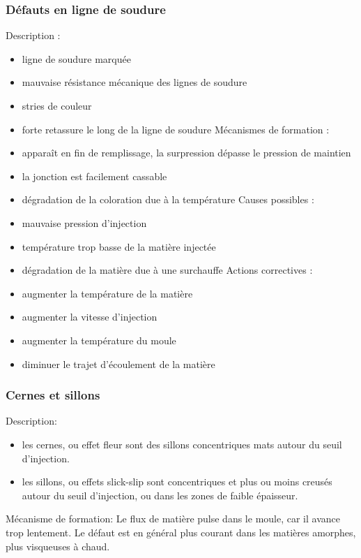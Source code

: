 \documentclass[11pt,oneside]{article}
\begin{document}
       \subsubsection{Défauts en ligne de soudure}
       Description : 
\begin{itemize}
 \item ligne de soudure marquée 
 \item mauvaise résistance mécanique des lignes de soudure 
 \item stries de couleur 
 \item forte retassure le long de la ligne de soudure 
       Mécanismes de formation : 
 \item apparaît en fin de remplissage, la surpression dépasse le pression de
maintien 
 \item la jonction est facilement cassable 
 \item dégradation de la coloration due à la température 
       Causes possibles : 
 \item mauvaise pression d’injection 
 \item température trop basse de la matière injectée 
 \item dégradation de la matière due à une surchauffe 
       Actions correctives : 
 \item augmenter la température de la matière 
 \item augmenter la vitesse d’injection 
 \item augmenter la température du moule 
 \item diminuer le trajet d’écoulement de la matière 
\end{itemize}
 
       \subsubsection{Cernes et sillons}
       Description: 
\begin{itemize}
 \item les  cernes,  ou  effet  fleur  sont  des  sillons  concentriques  mats 
autour  du  seuil d’injection. 
 \item les sillons, ou effets slick-slip sont concentriques et plus ou moins
creusés autour du seuil d’injection, ou dans les zones de faible
épaisseur. 
\end{itemize}
 
       
       Mécanisme de formation: 
       Le flux de matière pulse dans le moule, car il avance trop lentement. Le
défaut est en 
général plus courant dans les matières amorphes, plus visqueuses à chaud. 
        
\end{document}
